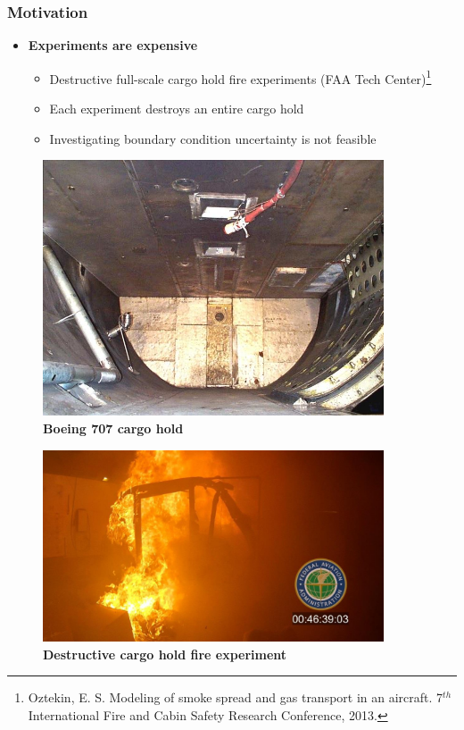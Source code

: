 \documentclass[9pt]{beamer}
\begin{document}
\begin{frame}
\frametitle{Motivation}
\label{sec-5-4}

\begin{itemize}
\item \textbf{Experiments are expensive}
\begin{itemize}
\item Destructive full-scale cargo hold fire experiments (FAA Tech Center)\footnote{Oztekin, E. S. Modeling of smoke spread and gas
transport in an aircraft. 7$^{th}$ International Fire and Cabin Safety
Research Conference, 2013.
 }
\item Each experiment destroys an entire cargo hold
\item Investigating boundary condition uncertainty is not feasible
\end{itemize}
\end{itemize}
\centering
\begin{minipage}[b]{0.45\linewidth}
\begin{figure}[ht]
\includegraphics[width=0.9\textwidth]{Boeing707CargoHold} \\
\textbf{Boeing 707 cargo hold}
\end{figure}
\end{minipage}
\begin{minipage}[b]{0.45\linewidth}
\begin{figure}[ht]
\includegraphics[width=0.9\textwidth]{CargoHoldFire1.png} \\
\textbf{Destructive cargo hold fire experiment}
\end{figure}
\end{minipage}
\end{frame}
\end{document}
